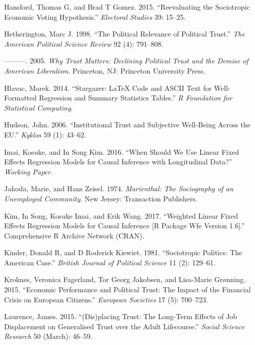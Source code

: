 \documentclass[12pt,]{article}
\begin{document}
\leavevmode\hypertarget{ref-Hansford2015-pd}{}%
Hansford, Thomas G, and Brad T Gomez. 2015. ``Reevaluating the Sociotropic Economic Voting Hypothesis.'' \emph{Electoral Studies} 39: 15--25.

\leavevmode\hypertarget{ref-Hetherington1998-kn}{}%
Hetherington, Marc J. 1998. ``The Political Relevance of Political Trust.'' \emph{The American Political Science Review} 92 (4): 791--808.

\leavevmode\hypertarget{ref-Hetherington2005-el}{}%
---------. 2005. \emph{Why Trust Matters: Declining Political Trust and the Demise of American Liberalism}. Princeton, NJ: Princeton University Press.

\leavevmode\hypertarget{ref-Hlavac2014-wd}{}%
Hlavac, Marek. 2014. ``Stargazer: LaTeX Code and ASCII Text for Well-Formatted Regression and Summary Statistics Tables.'' \emph{R Foundation for Statistical Computing}.

\leavevmode\hypertarget{ref-Hudson2006-hz}{}%
Hudson, John. 2006. ``Institutional Trust and Subjective Well-Being Across the EU.'' \emph{Kyklos} 59 (1): 43--62.

\leavevmode\hypertarget{ref-Imai2016-td}{}%
Imai, Kosuke, and In Song Kim. 2016. ``When Should We Use Linear Fixed Effects Regression Models for Causal Inference with Longitudinal Data?'' \emph{Working Paper}.

\leavevmode\hypertarget{ref-Jahoda1974-or}{}%
Jahoda, Marie, and Hans Zeisel. 1974. \emph{Marienthal: The Sociography of an Unemployed Community}. New Jersey: Transaction Publishers.

\leavevmode\hypertarget{ref-Kim2017-vu}{}%
Kim, In Song, Kosuke Imai, and Erik Wang. 2017. ``Weighted Linear Fixed Effects Regression Models for Causal Inference {[}R Package Wfe Version 1.6{]}.'' Comprehensive R Archive Network (CRAN).

\leavevmode\hypertarget{ref-Kinder1981-nz}{}%
Kinder, Donald R, and D Roderick Kiewiet. 1981. ``Sociotropic Politics: The American Case.'' \emph{British Journal of Political Science} 11 (2): 129--61.

\leavevmode\hypertarget{ref-Kroknes2015-ft}{}%
Kroknes, Veronica Fagerland, Tor Georg Jakobsen, and Lisa-Marie Grønning. 2015. ``Economic Performance and Political Trust: The Impact of the Financial Crisis on European Citizens.'' \emph{European Societies} 17 (5): 700--723.

\leavevmode\hypertarget{ref-Laurence2015-nk}{}%
Laurence, James. 2015. ``(Dis)placing Trust: The Long-Term Effects of Job Displacement on Generalised Trust over the Adult Lifecourse.'' \emph{Social Science Research} 50 (March): 46--59.
\end{document}
